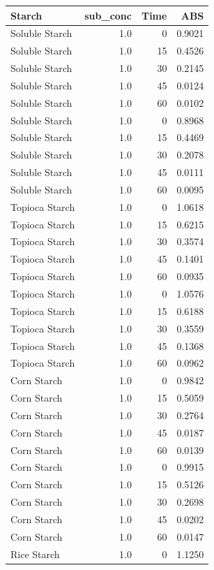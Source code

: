 \documentclass[
  12pt,
]{article}
\newcounter{none} %
\begin{document}
{\def\LTcaptype{none} %
\begin{longtable}[]{@{}lrrr@{}}
\toprule\noalign{}
Starch & sub\_conc & Time & ABS \\
\midrule\noalign{}
\endhead
\bottomrule\noalign{}
\endlastfoot
Soluble Starch & 1.0 & 0 & 0.9021 \\
Soluble Starch & 1.0 & 15 & 0.4526 \\
Soluble Starch & 1.0 & 30 & 0.2145 \\
Soluble Starch & 1.0 & 45 & 0.0124 \\
Soluble Starch & 1.0 & 60 & 0.0102 \\
Soluble Starch & 1.0 & 0 & 0.8968 \\
Soluble Starch & 1.0 & 15 & 0.4469 \\
Soluble Starch & 1.0 & 30 & 0.2078 \\
Soluble Starch & 1.0 & 45 & 0.0111 \\
Soluble Starch & 1.0 & 60 & 0.0095 \\
Topioca Starch & 1.0 & 0 & 1.0618 \\
Topioca Starch & 1.0 & 15 & 0.6215 \\
Topioca Starch & 1.0 & 30 & 0.3574 \\
Topioca Starch & 1.0 & 45 & 0.1401 \\
Topioca Starch & 1.0 & 60 & 0.0935 \\
Topioca Starch & 1.0 & 0 & 1.0576 \\
Topioca Starch & 1.0 & 15 & 0.6188 \\
Topioca Starch & 1.0 & 30 & 0.3559 \\
Topioca Starch & 1.0 & 45 & 0.1368 \\
Topioca Starch & 1.0 & 60 & 0.0962 \\
Corn Starch & 1.0 & 0 & 0.9842 \\
Corn Starch & 1.0 & 15 & 0.5059 \\
Corn Starch & 1.0 & 30 & 0.2764 \\
Corn Starch & 1.0 & 45 & 0.0187 \\
Corn Starch & 1.0 & 60 & 0.0139 \\
Corn Starch & 1.0 & 0 & 0.9915 \\
Corn Starch & 1.0 & 15 & 0.5126 \\
Corn Starch & 1.0 & 30 & 0.2698 \\
Corn Starch & 1.0 & 45 & 0.0202 \\
Corn Starch & 1.0 & 60 & 0.0147 \\
Rice Starch & 1.0 & 0 & 1.1250 \\

\end{longtable}}
\end{document}
